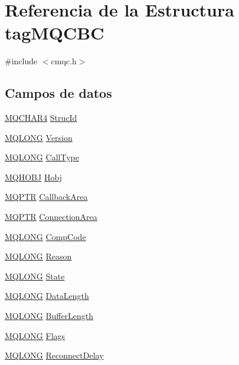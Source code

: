\hypertarget{structtag_m_q_c_b_c}{}\section{Referencia de la Estructura tag\+M\+Q\+C\+B\+C}
\label{structtag_m_q_c_b_c}


{\ttfamily \#include $<$cmqc.\+h$>$}

\subsection*{Campos de datos}
\begin{DoxyCompactItemize}
\item 
\hyperlink{cmqc_8h_a12590e546ed66fda7cf21c1d5cefa31d}{M\+Q\+C\+H\+A\+R4} \hyperlink{structtag_m_q_c_b_c_a0530922ca944569b52601d74941f96e4}{Struc\+Id}
\item 
\hyperlink{cmqc_8h_a1fb8d28cbda3fa8766a9821230cdb6d5}{M\+Q\+L\+O\+N\+G} \hyperlink{structtag_m_q_c_b_c_a0656ef8f766b3907d394d88a35d7b7e9}{Version}
\item 
\hyperlink{cmqc_8h_a1fb8d28cbda3fa8766a9821230cdb6d5}{M\+Q\+L\+O\+N\+G} \hyperlink{structtag_m_q_c_b_c_a0b568439fe1c5ce8239604c1ec58a387}{Call\+Type}
\item 
\hyperlink{cmqc_8h_ac093f559f81163292e6016c68c947164}{M\+Q\+H\+O\+B\+J} \hyperlink{structtag_m_q_c_b_c_a9f8f179d9e85063e5a265231422a9bf2}{Hobj}
\item 
\hyperlink{cmqc_8h_a0b835d8e479d7c42242ed9c6b6572f5a}{M\+Q\+P\+T\+R} \hyperlink{structtag_m_q_c_b_c_aec315c62e18aa72c5d04cadada50f160}{Callback\+Area}
\item 
\hyperlink{cmqc_8h_a0b835d8e479d7c42242ed9c6b6572f5a}{M\+Q\+P\+T\+R} \hyperlink{structtag_m_q_c_b_c_a58c83e52e3187c1579e9aeb6c52ded13}{Connection\+Area}
\item 
\hyperlink{cmqc_8h_a1fb8d28cbda3fa8766a9821230cdb6d5}{M\+Q\+L\+O\+N\+G} \hyperlink{structtag_m_q_c_b_c_a3d53860a50c3834d3dad9f5b2e5b5234}{Comp\+Code}
\item 
\hyperlink{cmqc_8h_a1fb8d28cbda3fa8766a9821230cdb6d5}{M\+Q\+L\+O\+N\+G} \hyperlink{structtag_m_q_c_b_c_ac2f0378cb0c66c5f91625822e53d7bae}{Reason}
\item 
\hyperlink{cmqc_8h_a1fb8d28cbda3fa8766a9821230cdb6d5}{M\+Q\+L\+O\+N\+G} \hyperlink{structtag_m_q_c_b_c_a55c511c2682a9c979eeb93d1a2259f42}{State}
\item 
\hyperlink{cmqc_8h_a1fb8d28cbda3fa8766a9821230cdb6d5}{M\+Q\+L\+O\+N\+G} \hyperlink{structtag_m_q_c_b_c_a75a536f04bbb17c49970e5ebeaeecacf}{Data\+Length}
\item 
\hyperlink{cmqc_8h_a1fb8d28cbda3fa8766a9821230cdb6d5}{M\+Q\+L\+O\+N\+G} \hyperlink{structtag_m_q_c_b_c_a4c13f4abce01a1fd714fb33ca2491583}{Buffer\+Length}
\item 
\hyperlink{cmqc_8h_a1fb8d28cbda3fa8766a9821230cdb6d5}{M\+Q\+L\+O\+N\+G} \hyperlink{structtag_m_q_c_b_c_a8da770267273b200fa9c968fa2a0da57}{Flags}
\item 
\hyperlink{cmqc_8h_a1fb8d28cbda3fa8766a9821230cdb6d5}{M\+Q\+L\+O\+N\+G} \hyperlink{structtag_m_q_c_b_c_aebfaff32156463b0ead92d765681ff04}{Reconnect\+Delay}
\end{DoxyCompactItemize}


